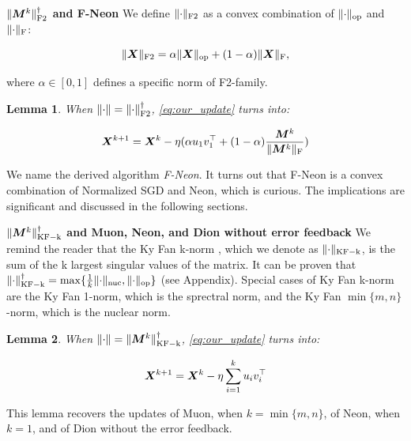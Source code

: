 \documentclass{article} %
\newtheorem{lemma}{Lemma}
\newcommand{\norm}[1]{\lVert #1\rVert}
\DeclarePairedDelimiter{\normf}{\|}{\|_\mathrm{F}}
\DeclarePairedDelimiter{\normkfk}{\|}{\|_\mathrm{KF-k}}
\DeclarePairedDelimiter{\normftwo}{\|}{\|_\mathrm{F2}}
\DeclarePairedDelimiter{\norms}{\|}{\|_{\mathrm{op}}}
\DeclarePairedDelimiter{\normn}{\|}{\|_{\mathrm{nuc}}}
\begin{document}
    {\bf $\normftwo{\mM^{k}}^\dagger$ and F-Neon}
        We define $\normftwo{\cdot}$ as a convex combination of $\norms{\cdot}$ and $\normf{\cdot}$:

        \begin{equation}\label{eq:ftwo_norm}
            \normftwo{\mX} = \alpha \norms{\mX} + (1-\alpha)\normf{\mX},
        \end{equation}

        where $\alpha \in [0, 1]$ defines a specific norm of F2-family.

    \begin{lemma}\label{lemma:nsgd_neon_update}    
        When $\norm{\cdot} = \normftwo{\cdot}^\dagger$, \cref{eq:our_update} turns into:

        \begin{equation}\label{eq:nsgd_neon_update}
            \mX^{k+1} = \mX^{k} - \eta (\alpha u_1 v_1^\top + (1-\alpha)\frac{\mM^k}{\normf{\mM^k}})
        \end{equation}
    \end{lemma}

        We name the derived algorithm \emph{F-Neon}. It turns out that F-Neon is a convex combination of Normalized SGD and Neon, which is curious. The implications are significant and discussed in the following sections.

    
    {\bf $\normkfk{\mM^k}^\dagger$ and Muon, Neon, and Dion without error feedback}
        We remind the reader that the Ky Fan k-norm \cite{fan1951maximum}, which we denote as $\normkfk{\cdot}$, is the sum of the k largest singular values of the matrix. It can be proven that $\normkfk{\cdot}^\dagger = \max\{\frac{1}{k} \normn{\cdot}, \norms{\cdot}\}$ (see Appendix). Special cases of Ky Fan k-norm are the Ky Fan 1-norm, which is the sprectral norm, and the Ky Fan $\min\{m, n\}$-norm, which is the nuclear norm.

        \begin{lemma}\label{lemma:ky_fan_update}    
            When $\norm{\cdot} = \normkfk{\mM^k}^\dagger$, \cref{eq:our_update} turns into:
    
            \begin{equation}\label{eq:ky_fan_update}
                {\bm{X}}^{k+1} = {\bm{X}}^{k} - \eta \sum_{i=1}^{k}u_i v_i^\top
            \end{equation}
        \end{lemma}
    
        This lemma recovers the updates of Muon, when $k=\min\{m, n\}$, of Neon, when $k=1$, and of Dion \cite{ahn2025dioncommunicationefficientoptimizerlarge} without the error feedback.
\end{document}
